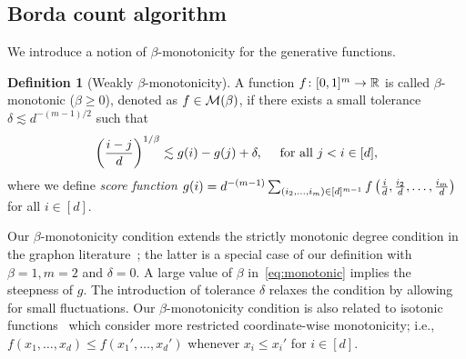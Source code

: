 \documentclass[11pt]{article}
\theoremstyle{definition}
\newtheorem{defn}{Definition}
\begin{document}
\subsection{Borda count algorithm}
We introduce a notion of $\beta$-monotonicity for the generative functions.
\begin{defn}[Weakly $\beta$-monotonicity]\label{eq:bdefn}A function $f\colon[0,1]^m \rightarrow \mathbb{R}$ is called $\beta$-monotonic ($\beta\geq 0$), denoted as $f\in\mathcal{M}(\beta)$, if there exists a small tolerance $\delta\lesssim d^{-(m-1)/2}$ such that
\begin{align}\label{eq:monotonic}
   \left({i-j\over d}\right)^{1/\beta}  \lesssim g(i)-g(j)+\delta,\quad \text{ for all } j<i\in[d],
\end{align}
where we define \emph{score function} $g(i) = d^{-(m-1)}\sum_{(i_2,\ldots,i_m)\in[d]^{m-1}} f\left({i\over d},{i_2\over d},\ldots,{i_m\over d}\right)$ for all $i \in[d]$.
\end{defn}

 
Our $\beta$-monotonicity condition extends the strictly monotonic degree condition in the graphon literature~\citep{chan2014consistent}; the latter is a special case of our definition with $\beta=1, m=2$ and $\delta=0$. A large value of $\beta$ in~\eqref{eq:monotonic} implies the steepness of $g$. The introduction of tolerance $\delta$ relaxes the condition by allowing for small fluctuations. Our $\beta$-monotonicity condition is also related to isotonic functions~\citep{pananjady2020isotonic} which consider more restricted coordinate-wise monotonicity; i.e., $f(x_1,\ldots,x_d)\leq f(x_1',\ldots,x_d')$
whenever $x_i\leq x_i'$ for $i\in[d]$. 
\end{document}
